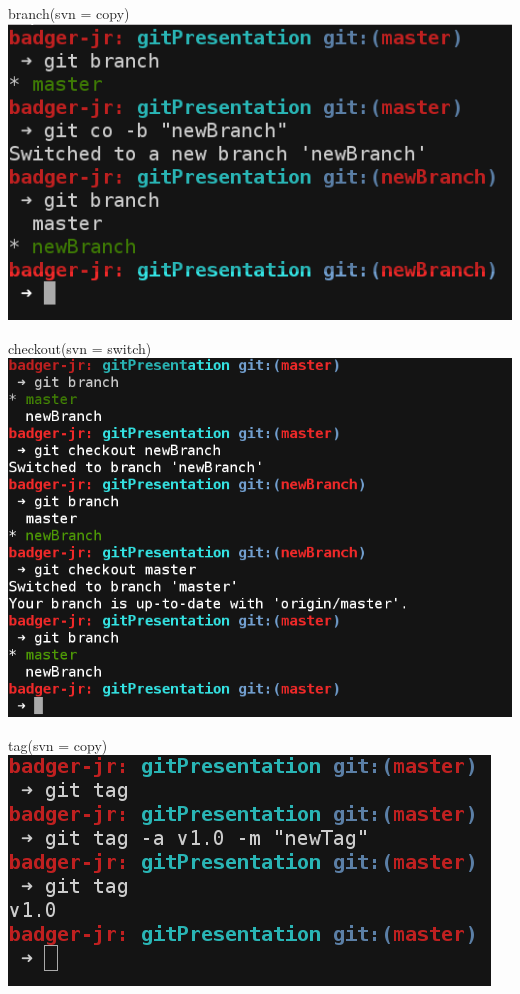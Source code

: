 \begin{frame}
	\begin{block}{branch(svn = copy)}
		\includegraphics[width=\textwidth]{./images/branch.png}
	\end{block}
\end{frame}
\begin{frame}
	\begin{block}{checkout(svn = switch)}
		\includegraphics[width=\textwidth]{./images/checkout.png}
	\end{block}
\end{frame}
\begin{frame}
	\begin{block}{tag(svn = copy)}
		\includegraphics[width=\textwidth]{./images/tag.png}
	\end{block}
\end{frame}
